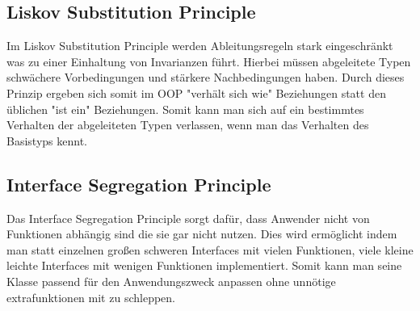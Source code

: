 
\subsection{Liskov Substitution Principle}
Im Liskov Substitution Principle werden Ableitungsregeln stark eingeschränkt was zu einer Einhaltung von Invarianzen führt.
Hierbei müssen abgeleitete Typen schwächere Vorbedingungen und stärkere Nachbedingungen haben.
Durch dieses Prinzip ergeben sich somit im OOP "verhält sich wie" Beziehungen statt den üblichen "ist ein" Beziehungen.
Somit kann man sich auf ein bestimmtes Verhalten der abgeleiteten Typen verlassen, wenn man das Verhalten des Basistyps kennt.

\subsection{Interface Segregation Principle}
Das Interface Segregation Principle sorgt dafür, dass Anwender nicht von Funktionen abhängig sind die sie gar nicht nutzen.
Dies wird ermöglicht indem man statt einzelnen großen schweren Interfaces mit vielen Funktionen, viele kleine leichte Interfaces mit wenigen Funktionen implementiert.
Somit kann man seine Klasse passend für den Anwendungszweck anpassen ohne unnötige extrafunktionen mit zu schleppen.

